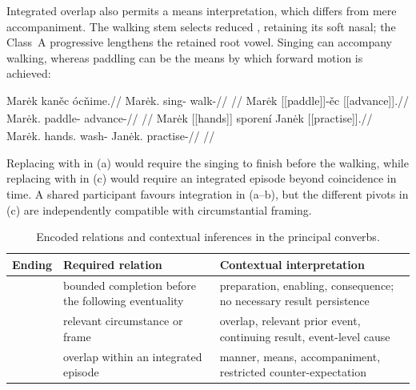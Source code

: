 Integrated overlap also permits a means interpretation, which differs from
mere accompaniment. The walking stem  selects reduced
, retaining its soft nasal; the Class~A progressive
 lengthens the retained root vowel. Singing can accompany
walking, whereas paddling can be the means by which forward motion is achieved:

\pex\label{ex:slot-integrated-activities}
\a
\begingl
\gla Marėk kaněc ócňime.//
\glb Marėk.\Dir{} sing-\Sim{} walk-\Prog{}//
\glft {}
//
\endgl
\a
\begingl
\gla Marėk [[paddle]]-ěc \textnormal{[[advance]]}\textsubscript{\Pf{}}.//
\glb Marėk.\Dir{} paddle-\Sim{} advance-\Pf{}//
\glft {}
//
\endgl
\a
\begingl
\gla Marėk \textnormal{[[hands]]}\textsubscript{\Ind{}} sporení Janėk \textnormal{[[practise]]}\textsubscript{\Prog{}}.//
\glb Marėk.\Dir{} hands.\Ind{} wash-\Circ{} Janėk.\Dir{} practise-\Prog{}//
\glft {}
//
\endgl
\xe

Replacing  with  in (a) would require the singing
to finish before the walking, while replacing  with 
in (c) would require an integrated episode beyond coincidence in time. A
shared participant favours integration in (a--b), but the different pivots in
(c) are independently compatible with circumstantial framing.

\begin{table}[ht]
\footnotesize
\caption{Encoded relations and contextual inferences in the principal converbs.}
\label{tab:converb-encoded-inferred}
\begin{tabularx}{\textwidth}{l L L}
\toprule
Ending & Required relation & Contextual interpretation \\
\midrule
{} & bounded completion before the following eventuality & preparation, enabling, consequence; no necessary result persistence \\
 & relevant circumstance or frame & overlap, relevant prior event, continuing result, event-level cause \\
 & overlap within an integrated episode & manner, means, accompaniment, restricted counter-expectation \\
\bottomrule
\end{tabularx}
\end{table}

